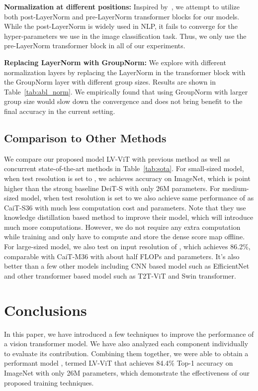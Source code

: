 \documentclass[10pt,twocolumn,letterpaper]{article}
\newcommand{\myPara}[1]{\vspace{.05in}\noindent\textbf{#1:}}
\newcommand{\nameofmethod}{LV-ViT}
\begin{document}
\myPara{Normalization at different positions} 
Inspired by~\cite{xiong2020layer}, we attempt to utilize both post-LayerNorm and pre-LayerNorm transformer blocks 
for our models.
While the post-LayerNorm is widely used in NLP, it fails to converge for the hyper-parameters
we use in the image classification task. 
Thus, we only use the pre-LayerNorm transformer block in all of our experiments.

\myPara{Replacing LayerNorm with GroupNorm}
We explore with different normalization layers by replacing the LayerNorm in the transformer block 
with the GroupNorm layer with different group sizes.
Results are shown in Table~\ref{tab:abl_norm}. 
We empirically found that using GroupNorm with larger group size would slow down the convergence 
and does not bring benefit to the final accuracy in the current setting.

\subsection{Comparison to Other Methods} \label{sec:comp_others}
We compare our proposed model \nameofmethod{} with previous method as well as concurrent state-of-the-art methods in Table~\ref{tab:sota}. For small-sized model, when test resolution is set to , we achieves  accuracy on ImageNet, which is  point higher than the strong baseline DeiT-S with only 26M parameters. For medium-sized model, when test resolution is set to  we also achieve same performance of  as CaiT-S36 with much less computation cost and parameters. Note that they use knowledge distillation based method to improve their model, which will introduce much more computations. However, we do not require any extra computation while training and only have to compute and store the dense score map offline. 
For large-sized model, we also test on input resolution of , which achieves 86.2\%, comparable with CaiT-M36 with about half FLOPs and parameters. It's also better than a few other models including CNN based model such as EfficientNet and other transformer based model such as T2T-ViT and Swin transformer.

\section{Conclusions}

In this paper, we have introduced a few techniques to improve the performance of a vision transformer model. We have also analyzed each component individually to evaluate its contribution. Combining them together, we were able to obtain a performant model , termed \nameofmethod{} that achieves 84.4\% Top-1 accuracy on ImageNet with only 26M parameters, which demonstrate the effectiveness of our proposed training techniques.

{\small


}
\end{document}
